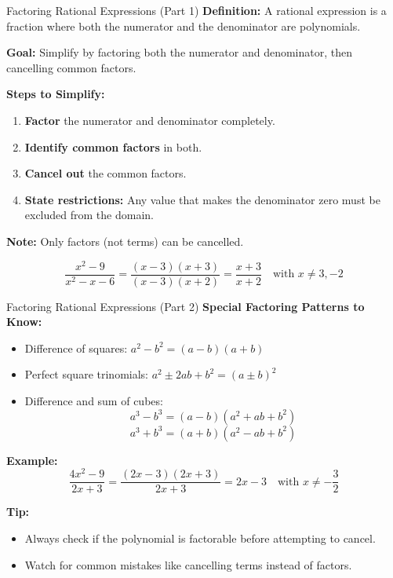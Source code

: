 \documentclass{beamer}
\begin{document}
\begin{frame}{Factoring Rational Expressions (Part 1)}
\small
\textbf{Definition:} A rational expression is a fraction where both the numerator and the denominator are polynomials.

\vspace{0.3cm}
\textbf{Goal:} Simplify by factoring both the numerator and denominator, then cancelling common factors.

\vspace{0.4cm}
\textbf{Steps to Simplify:}
\begin{enumerate}
    \item \textbf{Factor} the numerator and denominator completely.
    \item \textbf{Identify common factors} in both.
    \item \textbf{Cancel out} the common factors.
    \item \textbf{State restrictions:} Any value that makes the denominator zero must be excluded from the domain.
\end{enumerate}

\vspace{0.4cm}
\textbf{Note:} Only factors (not terms) can be cancelled.

\[
\frac{x^2 - 9}{x^2 - x - 6} = \frac{(x - 3)(x + 3)}{(x - 3)(x + 2)} = \frac{x + 3}{x + 2} \quad \text{with } x \ne 3, -2
\]
\end{frame}




\begin{frame}{Factoring Rational Expressions (Part 2)}
\small
\textbf{Special Factoring Patterns to Know:}
\begin{itemize}
    \item Difference of squares: $a^2 - b^2 = (a - b)(a + b)$
    \item Perfect square trinomials: $a^2 \pm 2ab + b^2 = (a \pm b)^2$
    \item Difference and sum of cubes:
    \[
    a^3 - b^3 = (a - b)(a^2 + ab + b^2)
    \]
    \[
    a^3 + b^3 = (a + b)(a^2 - ab + b^2)
    \]
\end{itemize}

\vspace{0.3cm}
\textbf{Example:}
\[
\frac{4x^2 - 9}{2x + 3} = \frac{(2x - 3)(2x + 3)}{2x + 3} = 2x - 3 \quad \text{with } x \ne -\frac{3}{2}
\]

\vspace{0.3cm}
\textbf{Tip:}
\begin{itemize}
    \item Always check if the polynomial is factorable before attempting to cancel.
    \item Watch for common mistakes like cancelling terms instead of factors.
\end{itemize}
\end{frame}
\end{document}
